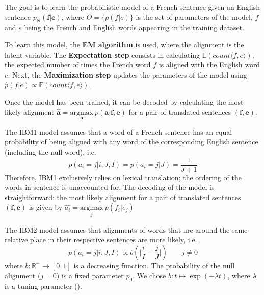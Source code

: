 \documentclass[final]{beamer}
\begin{document}
\begin{frame}[t]
\begin{multicols}{3}
The goal is to learn the probabilistic model of a French sentence given an English sentence $p_\Theta (\textbf{f} \vert \textbf{e})$, where $\Theta = \lbrace  p(f \vert e)\rbrace$ is the set of parameters of the model, $f$ and $e$ being the French and English words appearing in the training dataset.

To learn this model, the \textbf{EM algorithm} is used, where the alignment is the latent variable. The \textbf{Expectation step} consists in calculating $\mathbb{E}(count \langle f, e \rangle)$, the expected number of times the French word $f$ is aligned with the English word $e$. Next, the \textbf{Maximization step} updates the parameters of the model using $\hat{p}(f \vert e) \propto \mathbb{E}(count \langle f,e \rangle)$.

Once the model has been trained, it can be decoded by calculating the most likely alignment $\hat{\mathbf{a}} = \underset{\mathbf{a}}{\mathrm{argmax}} \ p(\mathbf{a} \vert \mathbf{f}, \mathbf{e})$ for a pair of translated sentences $(\textbf{f}, \textbf{e})$.
\medskip
\begin{center}
\end{center}
\medskip

The IBM1 model assumes that a word of a French sentence has an equal probability of being aligned with any word of the corresponding English sentence (including the null word), i.e. 
\begin{equation*}
p(a_i = j \vert i, J, I) = p(a_i = j \vert J) = \frac{1}{J + 1}
\end{equation*}
Therefore, IBM1 exclusively relies on lexical translation; the ordering of the words in sentence is unaccounted for. The decoding of the model is straightforward: the most likely alignment for a pair of translated sentences $(\textbf{f}, \textbf{e})$ is given by $\hat{a_i} =\underset{j}{\mathrm{argmax}} \ p(f_{i} \vert e_{j})$

\medskip
\begin{center}
\end{center}
\medskip

The IBM2 model assumes that alignments of words that are around the same relative place in their respective sentences are more likely, i.e. 
\begin{equation*}
p(a_i = j \vert i, J, I) \propto b( \vert \frac{i}{I} - \frac{j}{J} \vert) \qquad j \neq 0
\end{equation*}
where $b: \mathbb{R}^{+} \to [0, 1]$ is a decreasing function. The probability of the null alignment ($j=0$) is a fixed parameter $p_0$. We chose $b: t \mapsto \exp (- \lambda t)$, where $\lambda$ is a tuning parameter (\cite{dyer}).


\end{multicols}
\end{frame}
\end{document}
